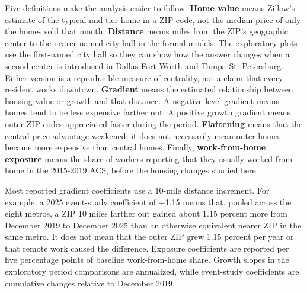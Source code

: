 \documentclass[11pt]{article}
\begin{document}
Five definitions make the analysis easier to follow. \textbf{Home value} means Zillow's estimate of the typical mid-tier home in a
ZIP code, not the median price of only the homes sold that month. \textbf{Distance} means miles from the ZIP's geographic center to
the nearer named city hall in the formal models. The exploratory plots use the first-named city hall so they can show how the
answer changes when a second center is introduced in Dallas-Fort Worth and Tampa-St. Petersburg. Either version is a reproducible
measure of centrality, not a claim that every resident works downtown.
\textbf{Gradient} means the estimated relationship between housing value or growth and that distance. A negative level gradient
means homes tend to be less expensive farther out. A positive growth gradient means outer ZIP codes appreciated faster during the
period. \textbf{Flattening} means that the central price advantage weakened; it does not necessarily mean outer homes became more
expensive than central homes. Finally, \textbf{work-from-home exposure} means the share of workers reporting that they usually
worked from home in the 2015-2019 ACS, before the housing changes studied here.

Most reported gradient coefficients use a 10-mile distance increment. For example, a 2025 event-study coefficient of $+$1.15
means that, pooled across the eight metros, a ZIP 10 miles farther out gained about 1.15 percent more from December 2019
to December 2025 than an otherwise equivalent nearer ZIP in the same metro. It does not mean that the outer ZIP grew 1.15 percent
per year or that remote work caused the difference. Exposure coefficients are reported per five percentage points of baseline
work-from-home share. Growth slopes in the exploratory period comparisons are annualized, while event-study coefficients are
cumulative changes relative to December 2019.
\end{document}
